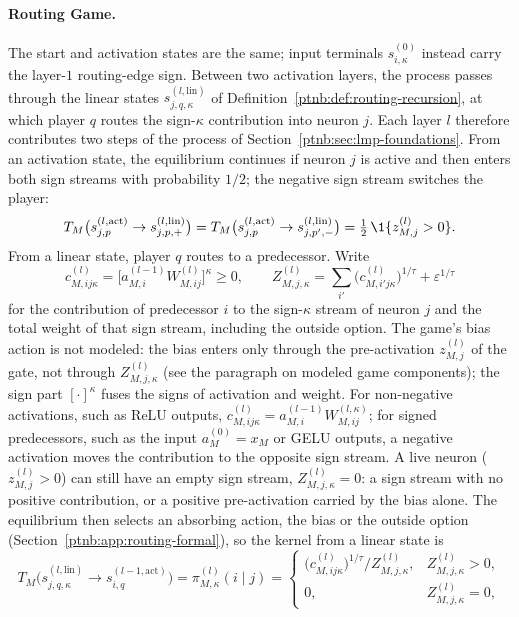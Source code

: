 \paragraph{Routing Game.}
The start and activation states are the same; input terminals $s^{(0)}_{i,\kappa}$ instead carry the layer-$1$ routing-edge sign. Between two activation layers, the process passes through the linear states $s^{(l,\mathrm{lin})}_{j,q,\kappa}$ of Definition~\ref{ptnb:def:routing-recursion}, at which player $q$ routes the sign-$\kappa$ contribution into neuron $j$. Each layer $l$ therefore contributes two steps of the process of Section~\ref{ptnb:sec:lmp-foundations}. From an activation state, the equilibrium continues if neuron $j$ is active and then enters both sign streams with probability $1/2$; the negative sign stream switches the player:
\begin{equation}\label{ptnb:eq:rg-gate}
 T_M\bigl(s^{(l,\mathrm{act})}_{j,p}\to s^{(l,\mathrm{lin})}_{j,p,+}\bigr)
 =T_M\bigl(s^{(l,\mathrm{act})}_{j,p}\to s^{(l,\mathrm{lin})}_{j,p',-}\bigr)
 =\tfrac12\,\1\{z^{(l)}_{M,j}>0\}.
\end{equation}
From a linear state, player $q$ routes to a predecessor. Write
\[
 c^{(l)}_{M,ij\kappa}=\bigl[a^{(l-1)}_{M,i}W^{(l)}_{M,ij}\bigr]^{\kappa}\ge0,
 \qquad
 Z^{(l)}_{M,j,\kappa}=\sum_{i'}\bigl(c^{(l)}_{M,i'j\kappa}\bigr)^{1/\tau}+\varepsilon^{1/\tau}
\]
for the contribution of predecessor $i$ to the sign-$\kappa$ stream of neuron $j$ and the total weight of that sign stream, including the outside option. The game's bias action is not modeled: the bias enters only through the pre-activation $z^{(l)}_{M,j}$ of the gate, not through $Z^{(l)}_{M,j,\kappa}$ (see the paragraph on modeled game components); the sign part $[\cdot]^\kappa$ fuses the signs of activation and weight. For non-negative activations, such as ReLU outputs, $c^{(l)}_{M,ij\kappa}=a^{(l-1)}_{M,i}W^{(l,\kappa)}_{M,ij}$; for signed predecessors, such as the input $a^{(0)}_M=x_M$ or GELU outputs, a negative activation moves the contribution to the opposite sign stream. A live neuron ($z^{(l)}_{M,j}>0$) can still have an empty sign stream, $Z^{(l)}_{M,j,\kappa}=0$: a sign stream with no positive contribution, or a positive pre-activation carried by the bias alone. The equilibrium then selects an absorbing action, the bias or the outside option (Section~\ref{ptnb:app:routing-formal}), so the kernel from a linear state is
\begin{equation}\label{ptnb:eq:rg-route}
 T_M\bigl(s^{(l,\mathrm{lin})}_{j,q,\kappa}\to s^{(l-1,\mathrm{act})}_{i,q}\bigr)
 =\pi^{(l)}_{M,\kappa}(i\mid j)
 =\begin{cases}
 \bigl(c^{(l)}_{M,ij\kappa}\bigr)^{1/\tau}/Z^{(l)}_{M,j,\kappa}, & Z^{(l)}_{M,j,\kappa}>0,\\
 0, & Z^{(l)}_{M,j,\kappa}=0,
 \end{cases}
\end{equation}

